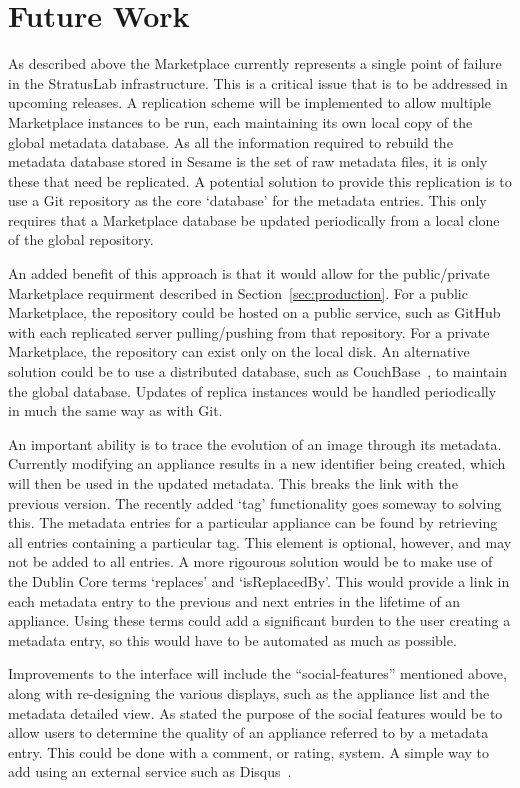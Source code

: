 \section{Future Work}
\label{sec:future-work}
As described above the Marketplace currently represents a single point of failure in the StratusLab infrastructure. This is a critical issue that is to be addressed in upcoming releases. A replication scheme will be implemented to allow multiple Marketplace instances to be run, each maintaining its own local copy of the global metadata database. As all the information required to rebuild the metadata database stored in Sesame is the set of raw metadata files, it is only these that need be replicated. A potential solution to provide this replication is to use a Git repository as the core `database' for the metadata entries. This only requires that a Marketplace database be updated periodically from a local clone of the global repository. 

An added benefit of this approach is that it would allow for the public/private Marketplace requirment described in Section~\ref{sec:production}. For a public Marketplace, the repository could be hosted on a public service, such as GitHub~\cite{github} with each replicated server pulling/pushing from that repository.  For a private Marketplace, the repository can exist only on the local disk. An alternative solution could be to use a distributed database, such as CouchBase~\cite{couchbase}, to maintain the global database. Updates of replica instances would be handled periodically in much the same way as with Git.

An important ability is to trace the evolution of an image through its metadata. Currently modifying an appliance results in a new identifier being created, which will then be used in the updated metadata. This breaks the link with the previous version. The recently added `tag' functionality goes someway to solving this.  The metadata entries for a particular appliance can be found by retrieving all entries containing a particular tag. This element is optional, however, and may not be added to all entries. A more rigourous solution would be to make use of the Dublin Core terms `replaces' and `isReplacedBy'. This would provide a link in each metadata entry to the previous and next entries in the lifetime of an appliance. Using these terms could add a significant burden to the user creating a metadata entry, so this would have to be automated as much as possible.

Improvements to the interface will include the ``social-features'' mentioned above, along with re-designing the various displays, such as the appliance list and the metadata detailed view. As stated the purpose of the social features would be to allow users to determine the quality of an appliance referred to by a metadata entry. This could be done with a comment, or rating, system. A simple way to add using an external service such as Disqus~\cite{disqus}.

